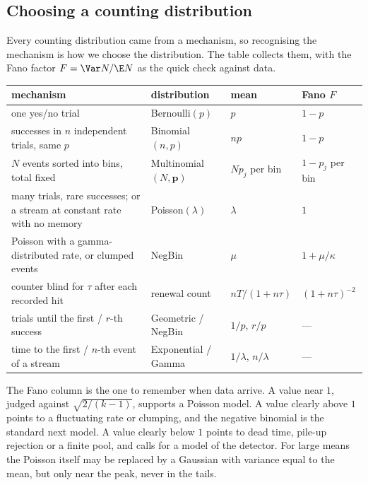 \subsection{Choosing a counting distribution}

Every counting distribution came from a mechanism, so recognising the mechanism is how we choose the distribution. The table collects them, with the Fano factor $F=\Var N/\E N$ as the quick check against data.

\begin{taxonomy}
\centering\small
\renewcommand{\arraystretch}{1.25}
\begin{tabular}{@{}>{\raggedright\arraybackslash}p{4.4cm}>{\raggedright\arraybackslash}p{2.7cm}>{\raggedright\arraybackslash}p{2.2cm}>{\raggedright\arraybackslash}p{2.1cm}@{}}
\textbf{mechanism} & \textbf{distribution} & \textbf{mean} & \textbf{Fano $F$}\\\hline
one yes/no trial & Bernoulli$(p)$ & $p$ & $1-p$\\
successes in $n$ independent trials, same $p$ & Binomial$(n,p)$ & $np$ & $1-p$\\
$N$ events sorted into bins, total fixed & Multinomial$(N,\bm p)$ & $Np_j$ per bin & $1-p_j$ per bin\\
many trials, rare successes; or a stream at constant rate with no memory & Poisson$(\lambda)$ & $\lambda$ & $1$\\
Poisson with a gamma-distributed rate, or clumped events & NegBin & $\mu$ & $1+\mu/\kappa$\\
counter blind for $\tau$ after each recorded hit & renewal count & $nT/(1+n\tau)$ & $(1+n\tau)^{-2}$\\
trials until the first / $r$-th success & Geometric / NegBin & $1/p$, $r/p$ & ---\\
time to the first / $n$-th event of a stream & Exponential / Gamma & $1/\lambda$, $n/\lambda$ & ---\\
\end{tabular}
\end{taxonomy}

The Fano column is the one to remember when data arrive. A value near $1$, judged against $\sqrt{2/(k-1)}$, supports a Poisson model. A value clearly above $1$ points to a fluctuating rate or clumping, and the negative binomial is the standard next model. A value clearly below $1$ points to dead time, pile-up rejection or a finite pool, and calls for a model of the detector. For large means the Poisson itself may be replaced by a Gaussian with variance equal to the mean, but only near the peak, never in the tails.

